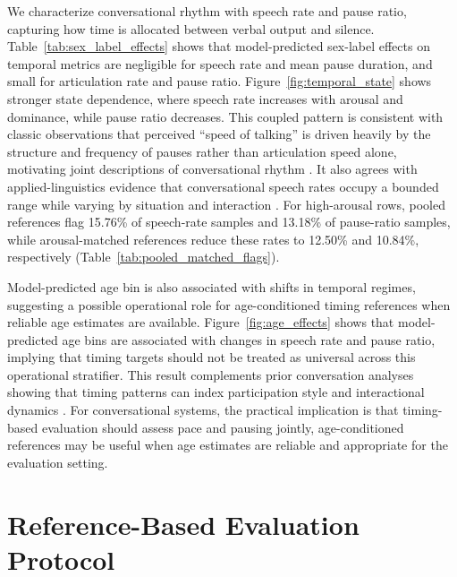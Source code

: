 \documentclass[conference]{IEEEtran}
\begin{document}
We characterize conversational rhythm with speech rate and pause ratio, capturing how time is allocated between verbal output and silence.
Table~\ref{tab:sex_label_effects} shows that model-predicted sex-label effects on temporal metrics are negligible for speech rate and mean pause duration, and small for articulation rate and pause ratio.
Figure~\ref{fig:temporal_state} shows stronger state dependence, where speech rate increases with arousal and dominance, while pause ratio decreases. 
This coupled pattern is consistent with classic observations that perceived ``speed of talking'' is driven heavily by the structure and frequency of pauses rather than articulation speed alone, motivating joint descriptions of conversational rhythm \cite{goldman1958speech, goldman1961significance}.
It also agrees with applied-linguistics evidence that conversational speech rates occupy a bounded range while varying by situation and interaction \cite{tauroza_speech_1990, nishizawa2024authenticity}.
For high-arousal rows, pooled references flag 15.76\% of speech-rate samples and 13.18\% of pause-ratio samples, while arousal-matched references reduce these rates to 12.50\% and 10.84\%, respectively (Table~\ref{tab:pooled_matched_flags}).

Model-predicted age bin is also associated with shifts in temporal regimes, suggesting a possible operational role for age-conditioned timing references when reliable age estimates are available. 
Figure~\ref{fig:age_effects} shows that model-predicted age bins are associated with changes in speech rate and pause ratio, implying that timing targets should not be treated as universal across this operational stratifier. 
This result complements prior conversation analyses showing that timing patterns can index participation style and interactional dynamics \cite{campbell2008individual}. 
For conversational systems, the practical implication is that timing-based evaluation should assess pace and pausing jointly, age-conditioned references may be useful when age estimates are reliable and appropriate for the evaluation setting.  

\section{Reference-Based Evaluation Protocol}\label{sec:evaluation_protocol}
\end{document}
